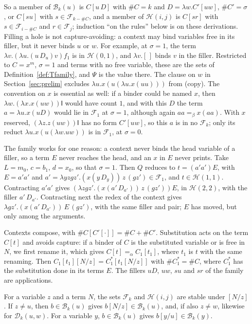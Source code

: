\documentclass[a4paper,english]{lipics-v2021}
\newcommand{\I}{\mathsf{I}}
\newcommand{\eqb}{=_{\beta}}
\newcommand{\Dd}[1]{D_{#1}}
\newcommand{\cnt}[1]{\##1}
\newcommand{\Fam}{\mathcal{F}}
\newcommand{\Bod}{\mathcal{B}}
\newcommand{\Hst}{\mathcal{H}}
\begin{document}
So a member of $\Bod_k(u)$ is $C[u\,D]$ with $\cnt{C} = k$ and $D = \lambda w.C'[uw]$, $\cnt{C'} = \sigma$, or $C[su]$ with $s \in \Fam_{k-\cnt{C}}$, and a member of $\Hst(i,j)$ is $C[sr]$ with $s \in \Fam_{i-\cnt{C}}$ and $r \in \Fam_j$; induction ``on the rules'' below is on these derivations. Filling a hole is not capture-avoiding: a context may bind variables free in its filler, but it never binds $u$ or $w$. For example, at $\sigma = 1$, the term $\lambda v.(\lambda u.(u\,\Dd{u})v)f_1$ is in $\Hst(0,1)$, and $\lambda v.[\,]$ binds $v$ in the filler. Restricted to $C = x^m$, $\sigma = 1$ and terms with no free variable, these are the sets of Definition~\ref{def:Tfamily}, and $\Psi$ is the value there. The clause on $w$ in Section~\ref{sec:prelim} excludes $\lambda u.x(u(\lambda u.x(uu)))$ from (copy). The convention on $x$ is essential as well: if a binder could be named $x$, then $\lambda w.(\lambda x.x(uw))\I$ would have count $1$, and with this $D$ the term $a = \lambda u.x(uD)$ would lie in $\Fam_1$ at $\sigma = 1$, although again $aa \eqb x(aa)$. With $x$ reserved, $(\lambda z.z(uw))\I$ has no form $C'[uw]$, so this $a$ is in no $\Fam_k$; only its reduct $\lambda u.x(u(\lambda w.uw))$ is in $\Fam_1$, at $\sigma = 0$.

The family works for one reason: a context never binds the head variable of a filler, so a term $E$ never reaches the head, and an $x$ in $E$ never prints. Take $L = m_0$, $c = b_1$, $d = x_0$, so that $\sigma = 1$. Then $Q$ reduces to $t = (a'a')E$, with $E = a'a'$ and $a' = \lambda yzgz'.(x(y\,\Dd{y}))\,z\,(gz') \in \Fam_1$, and $t \in \Hst(1,1)$. Contracting $a'a'$ gives $(\lambda zgz'.(x(a'\,\Dd{a'}))\,z\,(gz'))E$, in $\Hst(2,2)$, with the filler $a'\,\Dd{a'}$. Contracting next the redex of the context gives $\lambda gz'.(x(a'\,\Dd{a'}))\,E\,(gz')$, with the same filler and pair; $E$ has moved, but only among the arguments.

Contexts compose, with $\cnt{C[C'[\cdot]]} = \cnt{C}+\cnt{C'}$. Substitution acts on the term $C[t]$ and avoids capture: if a binder of $C$ is the substituted variable or is free in $N$, we first rename it, which gives $C[t] =_\alpha C_1[t_1]$, where $t_1$ is $t$ with the same renaming. Then $C_1[t_1][N/z] = C_1^*[t_1[N/z]]$ with $\cnt{C_1^*} = \cnt{C}$, where $C_1^*$ has the substitution done in its terms $E$. The fillers $uD$, $uw$, $su$ and $sr$ of the family are applications.

\begin{lemma}\label{lem:sub}
For a variable $z$ and a term $N$, the sets $\Fam_k$ and $\Hst(i,j)$ are stable under $[N/z]$. If $z \neq u$, then $b \in \Bod_k(u)$ gives $b[N/z] \in \Bod_k(u)$, and, if also $z \neq w$, likewise for $\mathcal{D}_k(u,w)$. For a variable $y$, $b \in \Bod_k(u)$ gives $b[y/u] \in \Bod_k(y)$.
\end{lemma}
\end{document}
